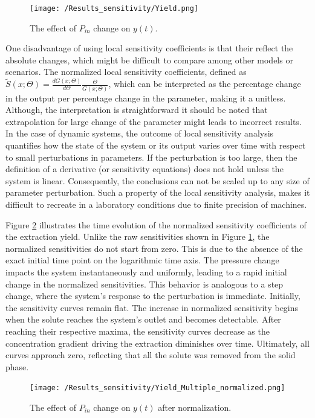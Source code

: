 \documentclass[a4paper,fleqn]{cas-dc}
\begin{document}
	\begin{figure}[!ht]
		\centering
		\texttt{[image: /Results\_sensitivity/Yield.png]}
		\caption{The effect of $P_{in}$ change on $y(t)$.}
		\label{fig:Sensitivty_P_y}
	\end{figure}
	
	{\color{blue}One disadvantage of using local sensitivity coefficients is that their reflect the absolute changes, which might be difficult to compare among other models or scenarios. The normalized local sensitivity coefficients, defined as $\tilde{S}(x;\Theta) = \frac{d G(x;\Theta)}{d\Theta} \frac{\Theta}{G(x;\Theta)}$, which can be interpreted as the percentage change in the output per percentage change in the parameter, making it a unitless. Although, the interpretation is straightforward it should be noted that extrapolation for large change of the parameter might leads to incorrect results. In the case of dynamic systems, the outcome of local sensitivity analysis quantifies how the state of the system or its output varies over time with respect to small perturbations in parameters. If the perturbation is too large, then the definition of a derivative (or sensitivity equations) does not hold unless the system is linear. Consequently, the conclusions can not be scaled up to any size of parameter perturbation. Such a property of the local sensitivity analysis, makes it difficult to recreate in a laboratory conditions due to finite precision of machines.
	
	Figure \ref{fig:Sensitivty_P_y_norm} illustrates the time evolution of the normalized sensitivity coefficients of the extraction yield. Unlike the raw sensitivities shown in Figure \ref{fig:Sensitivty_P_y}, the normalized sensitivities do not start from zero. This is due to the absence of the exact initial time point on the logarithmic time axis. The pressure change impacts the system instantaneously and uniformly, leading to a rapid initial change in the normalized sensitivities. This behavior is analogous to a step change, where the system's response to the perturbation is immediate. Initially, the sensitivity curves remain flat. The increase in normalized sensitivity begins when the solute reaches the system's outlet and becomes detectable. After reaching their respective maxima, the sensitivity curves decrease as the concentration gradient driving the extraction diminishes over time. Ultimately, all curves approach zero, reflecting that all the solute was removed from the solid phase.}
	
	\begin{figure}[!ht]
		\centering
		\texttt{[image: /Results\_sensitivity/Yield\_Multiple\_normalized.png]}
		\caption{The effect of $P_{in}$ change on $y(t)$ after normalization.}
		\label{fig:Sensitivty_P_y_norm}
	\end{figure}
	
\end{document}
